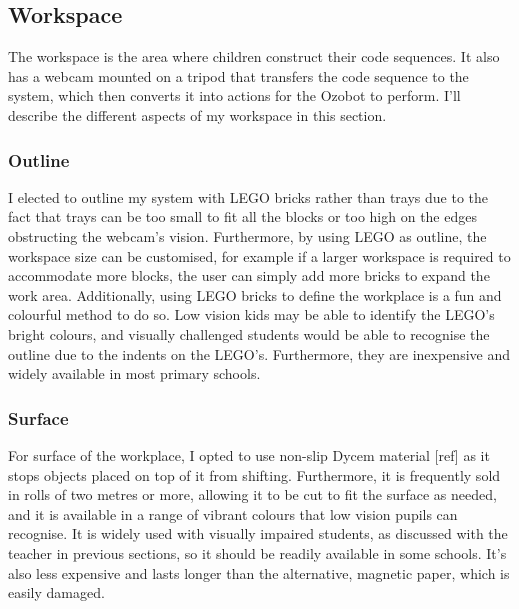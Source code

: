 \documentclass[oneside,%
                    author={Malak Hajji},
                    degree={BSc},
                    title={Designing An Accessible Computational Toolkit For Students},
                  subtitle={With Mixed Visual Abilities}]{dissertation}
\begin{document}
\subsection{Workspace}
The workspace is the area where children construct their code sequences. It also has a webcam mounted on a tripod that transfers the code sequence to the system, which then converts it into actions for the Ozobot to perform. I'll describe the different aspects of my workspace in this section.
\subsubsection{Outline}
I elected to outline my system with LEGO bricks rather than trays due to the fact that trays can be too small to fit all the blocks or too high on the edges obstructing the webcam's vision. Furthermore, by using LEGO as outline, the workspace size can be customised, for example if a larger workspace is required to accommodate more blocks, the user can simply add more bricks to expand the work area. Additionally, using LEGO bricks to define the workplace is a fun and colourful method to do so. Low vision kids may be able to identify
the LEGO's bright colours, and visually challenged students would be able to recognise the outline due to the indents on the LEGO's. Furthermore, they are inexpensive and widely available in most primary schools.

\subsubsection{Surface}
For surface of the workplace, I opted to use non-slip Dycem material [ref] as it stops objects placed on top of it from shifting. Furthermore, it is frequently sold in rolls of two metres or more, allowing it to be cut to fit the surface as needed, and it is available in a range of vibrant colours that low vision pupils can recognise. It is widely used with visually impaired students, as discussed with the teacher in previous sections, so it should be readily available in some schools. It's also less expensive and lasts longer than the alternative, magnetic paper, which is easily damaged.
\end{document}
